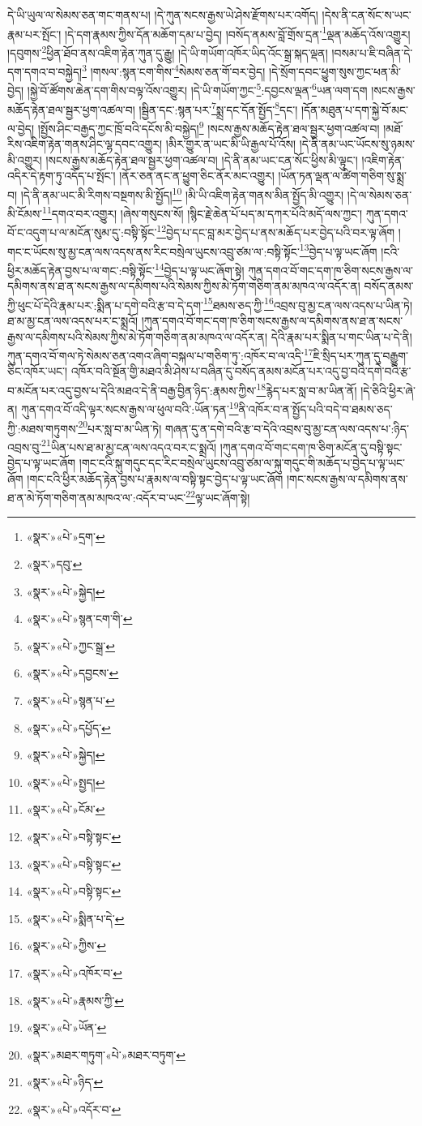 དེ་ཡི་ཡུལ་ལ་སེམས་ཅན་གང་གནས་པ། །དེ་ཀུན་སངས་རྒྱས་ཡེ་ཤེས་རྫོགས་པར་འགོད། །དེས་ནི་ངན་སོང་ས་ཡང་རྣམ་པར་སྤོང་། །དེ་དག་རྣམས་ཀྱིས་དོན་མཆོག་དམ་པ་བྱེད། །བསོད་ནམས་བློ་གྲོས་དྲན་\footnote{«སྣར་»«པེ་»དྲག་}ལྡན་མཆོད་འོས་འགྱུར། །དབུགས་\footnote{«སྣར་»དབུ་}ཕྱིན་ཐོབ་ནས་འཇིག་རྟེན་ཀུན་དུ་རྒྱུ། །དེ་ཡི་གཡོག་འཁོར་ཡིད་འོང་སྒྲ་སྐད་ལྡན། །བསམ་པ་ཇི་བཞིན་དེ་དག་དགའ་བ་བསྐྱེད།\footnote{«སྣར་»«པེ་»སྐྱེད།} །གསལ་:སྙན་ངག་གིས་\footnote{«སྣར་»«པེ་»སྙན་ངག་གི་}སེམས་ཅན་གོ་བར་བྱེད། །དེ་སྲོག་དབང་ཕྱུག་སུས་ཀྱང་ཕན་མི་བྱེད། །སྐྱེ་བོ་ཚོགས་ཆེན་དག་གིས་བལྟ་འོས་འགྱུར། །དེ་ཡི་གཡོག་ཀྱང་\footnote{«སྣར་»«པེ་»ཀྱང་སྒྲ་}:དབྱངས་ལྡན་\footnote{«སྣར་»«པེ་»དབྱངས་}ཡན་ལག་དག །སངས་རྒྱས་མཆོད་རྟེན་ཐལ་སྦྱར་ཕྱག་འཚལ་བ། །སྦྱིན་དང་:སྙན་པར་\footnote{«སྣར་»«པེ་»སྙན་པ་}སྨྲ་དང་དོན་སྤྱོད་\footnote{«སྣར་»«པེ་»དཔྱོད་}དང་། །དོན་མཐུན་པ་དག་སྐྱེ་བོ་མང་ལ་བྱེད། །སྤྱོས་ཤིང་བརྒྱད་ཀྱང་ཁྲོ་བའི་དངོས་མི་བསྐྱེད།\footnote{«སྣར་»«པེ་»སྐྱེད།} །སངས་རྒྱས་མཆོད་རྟེན་ཐལ་སྦྱར་ཕྱག་འཚལ་བ། །མཐོ་རིས་འཇིག་རྟེན་གནས་ཤིང་ལྷ་དབང་འགྱུར། །མིར་གྱུར་ན་ཡང་མི་ཡི་རྒྱལ་པོ་འོས། །དེ་ནི་ནམ་ཡང་ཡོངས་སུ་ཉམས་མི་འགྱུར། །སངས་རྒྱས་མཆོད་རྟེན་ཐལ་སྦྱར་ཕྱག་འཚལ་བ། །དེ་ནི་ནམ་ཡང་ངན་སོང་ཕྱིས་མི་ལྟུང་། །འཇིག་རྟེན་འདིར་དེ་རྟག་ཏུ་འདོད་པ་སྤོང་། །ནོར་ཅན་ནང་ན་ཕྱུག་ཅིང་ནོར་མང་འགྱུར། །ཡོན་ཏན་ལྡན་ལ་ཚིག་གཅིག་སུ་སྨྲ་བ། །དེ་ནི་ནམ་ཡང་མི་རིགས་བསྔགས་མི་སྤྱོད།\footnote{«སྣར་»«པེ་»སྤྱད།} །མི་ཡི་འཇིག་རྟེན་གནས་མིན་སྤྱོད་མི་འགྱུར། །དེ་ལ་སེམས་ཅན་མི་ངོམས་\footnote{«སྣར་»«པེ་»ངོམ་}དགའ་བར་འགྱུར། །ཞེས་གསུངས་སོ། །སྙིང་རྗེ་ཆེན་པོ་པད་མ་དཀར་པོའི་མདོ་ལས་ཀྱང་། ཀུན་དགའ་བོ་ང་འདུག་པ་ལ་མངོན་སུམ་དུ་:བསྟི་སྟོང་\footnote{«སྣར་»«པེ་»བསྟི་སྟང་}བྱེད་པ་དང་བླ་མར་བྱེད་པ་ནས་མཆོད་པར་བྱེད་པའི་བར་ལྟ་ཞོག །གང་ང་ཡོངས་སུ་མྱ་ངན་ལས་འདས་ནས་རིང་བསྲེལ་ཡུངས་འབྲུ་ཙམ་ལ་:བསྟི་སྟོང་\footnote{«སྣར་»«པེ་»བསྟི་སྟང་}བྱེད་པ་ལྟ་ཡང་ཞོག །ངའི་ཕྱིར་མཆོད་རྟེན་བྱས་པ་ལ་གང་:བསྟི་སྟོང་\footnote{«སྣར་»«པེ་»བསྟི་སྟང་}བྱེད་པ་ལྟ་ཡང་ཞོག་སྟེ། ཀུན་དགའ་བོ་གང་དག་ཁ་ཅིག་སངས་རྒྱས་ལ་དམིགས་ནས་ཐ་ན་སངས་རྒྱས་ལ་དམིགས་པའི་སེམས་ཀྱིས་མེ་ཏོག་གཅིག་ནམ་མཁའ་ལ་འདོར་ན། བསོད་ནམས་ཀྱི་ཕུང་པོ་དེའི་རྣམ་པར་:སྨིན་པ་དགེ་བའི་རྩ་བ་དེ་དག་\footnote{«སྣར་»«པེ་»སྨིན་པ་དེ་}ཐམས་ཅད་ཀྱི་\footnote{«སྣར་»«པེ་»ཀྱིས་}འབྲས་བུ་མྱ་ངན་ལས་འདས་པ་ཡིན་ཏེ། ཐ་མ་མྱ་ངན་ལས་འདས་པར་ང་སྨྲའོ། །ཀུན་དགའ་བོ་གང་དག་ཁ་ཅིག་སངས་རྒྱས་ལ་དམིགས་ནས་ཐ་ན་སངས་རྒྱས་ལ་དམིགས་པའི་སེམས་ཀྱིས་མེ་ཏོག་གཅིག་ནམ་མཁའ་ལ་འདོར་ན། དེའི་རྣམ་པར་སྨིན་པ་གང་ཡིན་པ་དེ་ནི། ཀུན་དགའ་བོ་གལ་ཏེ་སེམས་ཅན་འགའ་ཞིག་བསྐལ་པ་གཅིག་ཏུ་:འཁོར་བ་ལ་འདི་\footnote{«སྣར་»«པེ་»འཁོར་བ་}ཇི་སྲིད་པར་ཀུན་དུ་བརྒྱུག་ཅིང་འཁོར་ཡང་། འཁོར་བའི་སྔོན་གྱི་མཐའ་མི་ཤེས་པ་བཞིན་དུ་བསོད་ནམས་མངོན་པར་འདུ་བྱ་བའི་དགེ་བའི་རྩ་བ་མངོན་པར་འདུ་བྱས་པ་དེའི་མཐའ་དེ་ནི་བརྒྱ་བྱིན་ཉིད་:རྣམས་ཀྱིས་\footnote{«སྣར་»«པེ་»རྣམས་ཀྱི་}རྙེད་པར་སླ་བ་མ་ཡིན་ནོ། །དེ་ཅིའི་ཕྱིར་ཞེ་ན། ཀུན་དགའ་བོ་འདི་ལྟར་སངས་རྒྱས་ལ་ཕུལ་བའི་:ཡོན་ཏན་\footnote{«སྣར་»«པེ་»ཡོན་}ནི་འཁོར་བ་ན་སྤྱོད་པའི་བདེ་བ་ཐམས་ཅད་ཀྱི་:མཐས་གཏུགས་\footnote{«སྣར་»མཐར་གཏུག་«པེ་»མཐར་བཏུག་}པར་སླ་བ་མ་ཡིན་ཏེ། གཞན་དུ་ན་དགེ་བའི་རྩ་བ་དེའི་འབྲས་བུ་མྱ་ངན་ལས་འདས་པ་:ཉིད་འབྲས་བུ་\footnote{«སྣར་»«པེ་»ཉིད་}ཡིན་པས་ཐ་མ་མྱ་ངན་ལས་འདའ་བར་ང་སྨྲའོ། །ཀུན་དགའ་བོ་གང་དག་ཁ་ཅིག་མངོན་དུ་བསྟི་སྟང་བྱེད་པ་ལྟ་ཡང་ཞོག །གང་ངའི་སྐུ་གདུང་དང་རིང་བསྲེལ་ཡུངས་འབྲུ་ཙམ་ལ་སྐུ་གདུང་གི་མཆོད་པ་བྱེད་པ་ལྟ་ཡང་ཞོག །གང་ངའི་ཕྱིར་མཆོད་རྟེན་བྱས་པ་རྣམས་ལ་བསྟི་སྟང་བྱེད་པ་ལྟ་ཡང་ཞོག །གང་སངས་རྒྱས་ལ་དམིགས་ནས་ཐ་ན་མེ་ཏོག་གཅིག་ནམ་མཁའ་ལ་:འདོར་བ་ཡང་\footnote{«སྣར་»«པེ་»འདོར་བ་}ལྟ་ཡང་ཞོག་སྟེ། 